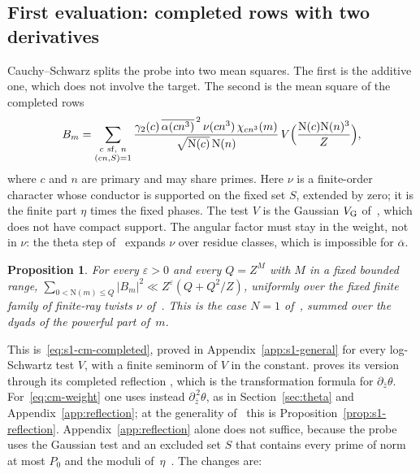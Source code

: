 \documentclass[11pt]{article}
\numberwithin{equation}{section}
\newcommand{\N}{\mathrm N}
\newtheorem{proposition}{Proposition}
\begin{document}
\subsection{First evaluation: completed rows with two derivatives}
Cauchy--Schwarz splits the probe \cite[\S3.2]{G78} into two mean squares. The first is
the additive one, which does not involve the target. The second is the mean square of
the completed rows
\begin{equation}\label{eq:d076}
 B_m=\sum_{\substack{c\ {\rm sf},\ n\\(cn,S)=1}}
 \frac{\gamma_2(c)\,\overline{\alpha(cn^3)}^{\,2}\,\nu(cn^3)\,\chi_{cn^3}(m)}{\sqrt{\N(c)}\,\N(n)}
 \,V\Bigl(\frac{\N(c)\N(n)^3}Z\Bigr),
\end{equation}
where $c$ and $n$ are primary and may share primes. Here $\nu$ is a finite-order character whose conductor is
supported on the fixed set $S$, extended by zero; it is the finite part $\eta$ times the fixed phases. The test $V$ is
the Gaussian $V_{\rm G}$ of~\cite[Section~5.5]{OAI78}, which does not have compact support. The angular factor must
stay in the weight, not in $\nu$: the theta step of~\cite{OAI78} expands $\nu$ over residue
classes, which is impossible for $\overline\alpha$.

\begin{proposition}\label{prop:cm-completed}
For every $\varepsilon>0$ and every $Q=Z^M$ with $M$ in a fixed bounded range,
$\sum_{0<\N(m)\le Q}|B_m|^2\ll Z^{\varepsilon}(Q+Q^2/Z)$, uniformly over the fixed finite family of
finite-ray twists $\nu$ of~\cite{OAI78}. This is the case $N=1$
of~\cite[Lemma~5.8]{OAI78}, summed over the dyads of the powerful part of~$m$.
\end{proposition}
This is~\eqref{eq:s1-cm-completed}, proved in Appendix~\ref{app:s1-general} for every log-Schwartz test $V$, with a
finite seminorm of $V$ in the constant. \cite{OAI78} proves its version through its completed reflection
\cite[Prop.~5.1]{OAI78}, which is the transformation formula for
$\partial_{\bar z}\theta$. For~\eqref{eq:cm-weight} one uses instead $\partial_{\bar z}^{\,2}\theta$,
as in Section~\ref{sec:theta} and Appendix~\ref{app:reflection}; at the generality of~\cite{OAI78} this is
Proposition~\ref{prop:s1-reflection}. Appendix~\ref{app:reflection} alone does not suffice, because the probe
uses the Gaussian test and an excluded set $S$ that contains every prime of norm at most $P_0$ and the moduli
of~$\eta$~\cite[Section~6.1]{OAI78}. The changes are:
\end{document}
